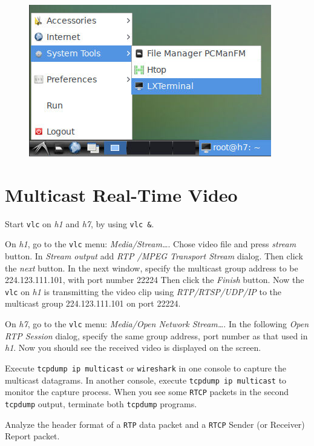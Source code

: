 \documentclass{../UTNetLab}
\begin{document}
    \begin{figure}[H]
        \centering
        \includegraphics[scale=1.6]{img/terminal}
    \end{figure}

\section{Multicast Real-Time Video}
    Start \lstinline{vlc} on \textit{h1} and \textit{h7}, by using \lstinline{vlc &}. 

    On \textit{h1}, go to the \lstinline{vlc} menu: \textit{Media/Stream\ldots }. Chose video file  and press \textit{stream} button. In \textit{Stream output} add \textit{RTP /MPEG Transport Stream} dialog.
    Then click the \textit{next} button.
    In the next window, specify the multicast group address to be {224.123.111.101}, with port number {22224} %
    Then click the \textit{Finish} button.
    Now the \lstinline{vlc} on \textit{h1} is transmitting the video clip using \textit{RTP/RTSP/UDP/IP} to the multicast group {224.123.111.101} on port {22224}. 

    On \textit{h7}, go to the \lstinline{vlc} menu: \textit{Media/Open Network Stream\ldots}. In the following \textit{Open RTP Session} dialog, specify the same group address, port number as that used in \textit{h1}.%
    Now you should see the received video is displayed on the screen. 

    Execute \lstinline{tcpdump ip multicast} or \lstinline{wireshark} in one console to capture the multicast datagrams.
    In another console, execute \lstinline{tcpdump ip multicast} to monitor the capture process.
    When you see some \texttt{RTCP} packets in the second \lstinline{tcpdump} output, terminate both \lstinline{tcpdump} programs. 

    Analyze the header format of a \texttt{RTP} data packet and a \texttt{RTCP} Sender (or Receiver) Report packet.
\end{document}
